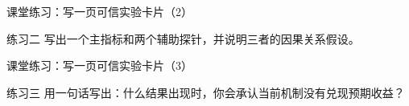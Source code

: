 \begin{frame}{课堂练习：写一页可信实验卡片（2）}
\begin{block}{练习二}
    写出一个主指标和两个辅助探针，并说明三者的因果关系假设。
  \end{block}
\end{frame}

\begin{frame}{课堂练习：写一页可信实验卡片（3）}
\begin{block}{练习三}
    用一句话写出：什么结果出现时，你会承认当前机制没有兑现预期收益？
  \end{block}
\end{frame}
